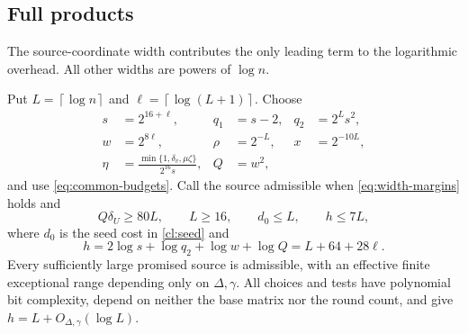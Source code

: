\documentclass[11pt]{article} \usepackage[utf8]{inputenc}
\theoremstyle{plain} \newtheorem{theorem}{Theorem}[section]
\theoremstyle{definition} \newaliascnt{definition}{theorem}
\newcommand{\ceil}[1]{\left\lceil#1\right\rceil}
\begin{document}
\subsection{Full products}

The source-coordinate width contributes the only leading term to the
logarithmic overhead. All other widths are powers of $\log n$.

\begin{lemma}\label{lem:full-schedule}
Put $L=\ceil{\log n}$ and $\ell=\ceil{\log(L+1)}$. Choose
\[
\begin{aligned}
s&=2^{16+\ell},&q_1&=s-2,&q_2&=2^Ls^2,\\
w&=2^{8\ell},&\rho&=2^{-L},&x&=2^{-10L},\\
\eta&=\frac{\min\{1,\delta_v,\mu\zeta\}}{2^{16}s},&
Q&=w^2,
\end{aligned}
\]
and use \eqref{eq:common-budgets}. Call the source admissible when
\eqref{eq:width-margins} holds and
\[
Q\delta_U\ge80L,\qquad L\ge16,\qquad d_0\le L,\qquad h\le7L,
\]
where $d_0$ is the seed cost in \cref{cl:seed} and
\[
h=2\log s+\log q_2+\log w+\log Q=L+64+28\ell.
\]
Every sufficiently large promised source is admissible, with an effective
finite exceptional range depending only on $\Delta,\gamma$. All choices and
tests have polynomial bit complexity, depend on neither the base matrix nor
the round count, and give $h=L+O_{\Delta,\gamma}(\log L)$.
\end{lemma}
\end{document}
